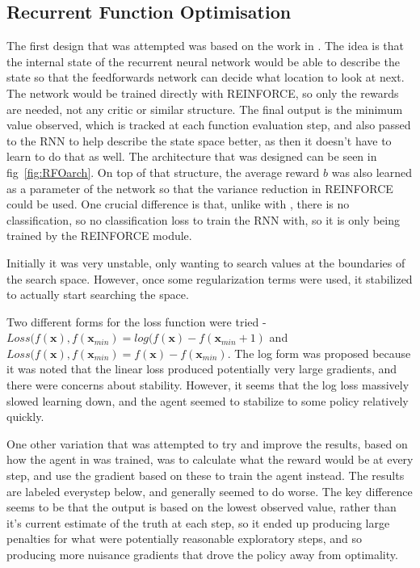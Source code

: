 \subsection{Recurrent Function Optimisation}
The first design that was attempted was based on the work in \cite{RVA}. The idea is that the internal state of the recurrent neural network would be able to describe the state so that the feedforwards network can decide what location to look at next. The network would be trained directly with REINFORCE, so only the rewards are needed, not any critic or similar structure. The final output is the minimum value observed, which is tracked at each function evaluation step, and also passed to the RNN to help describe the state space better, as then it doesn't have to learn to do that as well. The architecture that was designed can be seen in fig~\ref{fig:RFOarch}. On top of that structure, the average reward $b$ was also learned as a parameter of the network so that the variance reduction in REINFORCE could be used. One crucial difference is that, unlike with \cite{RVA}, there is no classification, so no classification loss to train the RNN with, so it is only being trained by the REINFORCE module.

Initially it was very unstable, only wanting to search values at the boundaries of the search space. However, once some regularization terms were used, it stabilized to actually start searching the space.

Two different forms for the loss function were tried - $Loss(f(\boldsymbol{x}), f(\boldsymbol{x}_{min}) = log(f(\boldsymbol{x}) - f(\boldsymbol{x}_{min} +1)$ and $Loss(f(\boldsymbol{x}), f(\boldsymbol{x}_{min}) = f(\boldsymbol{x}) - f(\boldsymbol{x}_{min})$. The log form was proposed because it was noted that the linear loss produced potentially very large gradients, and there were concerns about stability. However, it seems that the log loss massively slowed learning down, and the agent seemed to stabilize to some policy relatively quickly.

One other variation that was attempted to try and improve the results, based on how the agent in \cite{RVA} was trained, was to calculate what the reward would be at every step, and use the gradient based on these to train the agent instead. The results are labeled everystep below, and generally seemed to do worse. The key difference seems to be that the output is based on the lowest observed value, rather than it's current estimate of the truth at each step, so it ended up producing large penalties for what were potentially reasonable exploratory steps, and so producing more nuisance gradients that drove the policy away from optimality.

